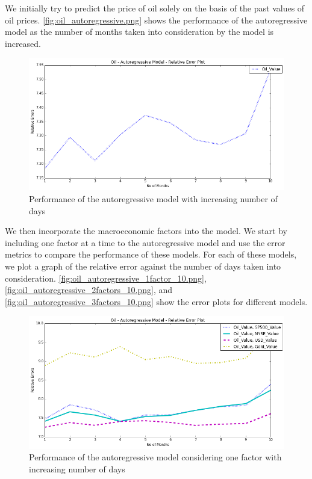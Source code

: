 \documentclass[runningheads]{llncs}
\begin{document}
We initially try to predict the price of oil solely on the basis of the past values of oil prices. \autoref{fig:oil_autoregressive.png} shows the performance of the autoregressive model as the number of months taken into consideration by the model is increased. \\

\begin{figure}
\centering
\includegraphics[width=\textwidth]{oil_autoregressive.png}
\caption{Performance of the autoregressive model with increasing number of days}
\label{fig:oil_autoregressive.png}
\end{figure}

We then incorporate the macroeconomic factors into the model. We start by including one factor at a time to the autoregressive model and use the error metrics to compare the performance of these models. For each of these models, we plot a graph of the relative error against the number of days taken into consideration. \autoref{fig:oil_autoregressive_1factor_10.png}, \autoref{fig:oil_autoregressive_2factors_10.png}, and \autoref{fig:oil_autoregressive_3factors_10.png} show the error plots for different models. 

\begin{figure}
\centering
\includegraphics[width=\textwidth]{oil_autoregressive_1factor_10.png}
\caption{Performance of the autoregressive model considering one factor with increasing number of days}
\label{fig:oil_autoregressive_1factor_10.png}
\end{figure}
\end{document}
